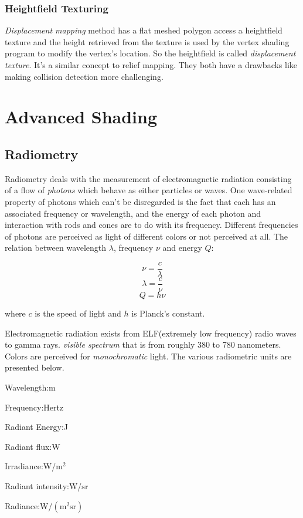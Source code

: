 \documentclass[10pt, a4paper]{article}
\begin{document}
    \subsubsection{Heightfield Texturing}
        \emph{Displacement mapping} method has a flat meshed polygon access a heightfield texture and the height retrieved from the texture is used by the vertex shading program to modify the vertex's location. So the heightfield is called \emph{displacement texture}. It's a similar concept to relief mapping. They both have a drawbacks like making collision detection more challenging. 

\newpage

\section{Advanced Shading}
    \subsection{Radiometry}
        Radiometry deals with the measurement of electromagnetic radiation consisting of a flow of \emph{photons} which behave as either particles or waves. One wave-related property of photons which can't be disregarded is the fact that each has an associated frequency or wavelength, and the energy of each photon and interaction with rods and cones are to do with its frequency.  Different frequencies of photons are perceived as light of different colors or not perceived at all. The relation between wavelength $\lambda$, frequency $\nu$ and energy $Q$: 

        $$\nu = \frac{c}{\lambda}$$
        $$\lambda = \frac{c}{\nu}$$
        $$Q = h\nu$$

        where $c$ is the speed of light and $h$ is Planck's constant. 

        Electromagnetic radiation exists from ELF(extremely low frequency) radio waves to gamma rays.  \emph{visible spectrum} that is from roughly 380 to 780 nanometers. Colors are perceived for \emph{monochromatic} light. The various radiometric units are presented below. 
        \begin{center}
            Wavelength:\quad m

            Frequency:\quad Hertz
            
            Radiant Energy:\quad J 
            
            Radiant flux:\quad W

            Irradiance:\quad W/$\text{m}^2$

            Radiant intensity:\quad W/$\text{sr}$

            Radiance:\quad W/$(\text{m}^2\text{sr})$
        \end{center}
    
\end{document}
